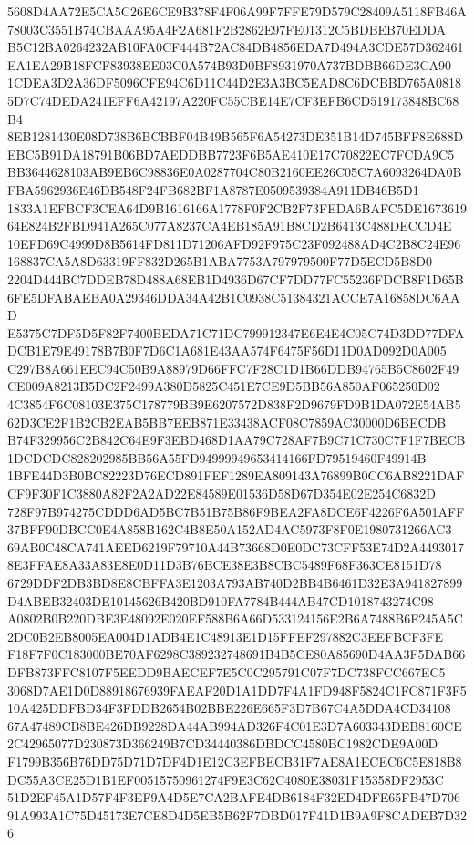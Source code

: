 \documentclass[UTF8,fontset=fandol,zihao=-4,a4paper]{ctexart}
\begin{document}
{{5608D4AA72E5CA5C26E6CE9B378F4F06A99F7FFE79D579C28409A5118FB46A78003C3551B74CBAAA95A4F2A681F2B2862E97FE01312C5BDBEB70EDDA
B5C12BA0264232AB10FA0CF444B72AC84DB4856EDA7D494A3CDE57D362461EA1EA29B18FCF83938EE03C0A574B93D0BF8931970A737BDBB66DE3CA90
1CDEA3D2A36DF5096CFE94C6D11C44D2E3A3BC5EAD8C6DCBBD765A08185D7C74DEDA241EFF6A42197A220FC55CBE14E7CF3EFB6CD519173848BC68B4
8EB1281430E08D738B6BCBBF04B49B565F6A54273DE351B14D745BFF8E688DEBC5B91DA18791B06BD7AEDDBB7723F6B5AE410E17C70822EC7FCDA9C5
BB3644628103AB9EB6C98836E0A0287704C80B2160EE26C05C7A6093264DA0BFBA5962936E46DB548F24FB682BF1A8787E0509539384A911DB46B5D1
1833A1EFBCF3CEA64D9B1616166A1778F0F2CB2F73FEDA6BAFC5DE167361964E824B2FBD941A265C077A8237CA4EB185A91B8CD2B6413C488DECCD4E
10EFD69C4999D8B5614FD811D71206AFD92F975C23F092488AD4C2B8C24E96168837CA5A8D63319FF832D265B1ABA7753A797979500F77D5ECD5B8D0
2204D444BC7DDEB78D488A68EB1D4936D67CF7DD77FC55236FDCB8F1D65B6FE5DFABAEBA0A29346DDA34A42B1C0938C51384321ACCE7A16858DC6AAD
E5375C7DF5D5F82F7400BEDA71C71DC799912347E6E4E4C05C74D3DD77DFADCB1E79E49178B7B0F7D6C1A681E43AA574F6475F56D11D0AD092D0A005
C297B8A661EEC94C50B9A88979D66FFC7F28C1D1B66DDB94765B5C8602F49CE009A8213B5DC2F2499A380D5825C451E7CE9D5BB56A850AF065250D02
4C3854F6C08103E375C178779BB9E6207572D838F2D9679FD9B1DA072E54AB562D3CE2F1B2CB2EAB5BB7EEB871E33438ACF08C7859AC30000D6BECDB
B74F329956C2B842C64E9F3EBD468D1AA79C728AF7B9C71C730C7F1F7BECB1DCDCDC828202985BB56A55FD94999949653414166FD79519460F49914B
1BFE44D3B0BC82223D76ECD891FEF1289EA809143A76899B0CC6AB8221DAFCF9F30F1C3880A82F2A2AD22E84589E01536D58D67D354E02E254C6832D
728F97B974275CDDD6AD5BC7B51B75B86F9BEA2FA8DCE6F4226F6A501AFF37BFF90DBCC0E4A858B162C4B8E50A152AD4AC5973F8F0E1980731266AC3
69AB0C48CA741AEED6219F79710A44B73668D0E0DC73CFF53E74D2A44930178E3FFAE8A33A83E8E0D11D3B76BCE38E3B8CBC5489F68F363CE8151D78
6729DDF2DB3BD8E8CBFFA3E1203A793AB740D2BB4B6461D32E3A941827899D4ABEB32403DE10145626B420BD910FA7784B444AB47CD1018743274C98
A0802B0B220DBE3E48092E020EF588B6A66D533124156E2B6A7488B6F245A5C2DC0B2EB8005EA004D1ADB4E1C48913E1D15FFEF297882C3EEFBCF3FE
F18F7F0C183000BE70AF6298C389232748691B4B5CE80A85690D4AA3F5DAB66DFB873FFC8107F5EEDD9BAECEF7E5C0C295791C07F7DC738FCC667EC5
3068D7AE1D0D88918676939FAEAF20D1A1DD7F4A1FD948F5824C1FC871F3F510A425DDFBD34F3FDDB2654B02BBE226E665F3D7B67C4A5DDA4CD34108
67A47489CB8BE426DB9228DA44AB994AD326F4C01E3D7A603343DEB8160CE2C42965077D230873D366249B7CD34440386DBDCC4580BC1982CDE9A00D
F1799B356B76DD75D71D7DF4D1E12C3EFBECB31F7AE8A1ECEC6C5E818B8DC55A3CE25D1B1EF00515750961274F9E3C62C4080E38031F15358DF2953C
51D2EF45A1D57F4F3EF9A4D5E7CA2BAFE4DB6184F32ED4DFE65FB47D70691A993A1C75D45173E7CE8D4D5EB5B62F7DBD017F41D1B9A9F8CADEB7D326
}}
\end{document}
